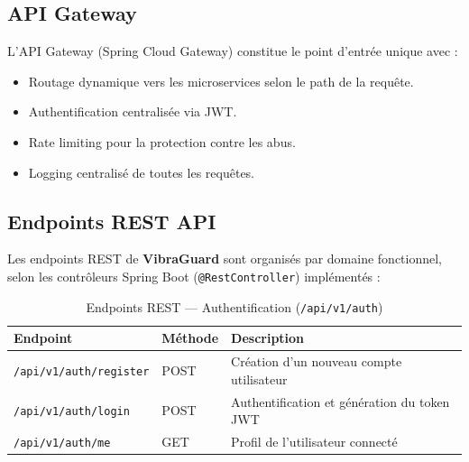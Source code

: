 \documentclass[12pt, a4paper, oneside]{report}
\newcommand{\projectname}{\textbf{VibraGuard}}
\begin{document}
\subsection{API Gateway}

L'API Gateway (Spring Cloud Gateway) constitue le point d'entrée unique avec :
\begin{itemize}
  \item Routage dynamique vers les microservices selon le path de la requête.
  \item Authentification centralisée via JWT.
  \item Rate limiting pour la protection contre les abus.
  \item Logging centralisé de toutes les requêtes.
\end{itemize}

\subsection{Endpoints REST API}

Les endpoints REST de \projectname{} sont organisés par domaine fonctionnel, selon les
contrôleurs Spring Boot (\texttt{@RestController}) implémentés :

\begin{table}[H]
  \centering
  \scriptsize
  \begin{tabularx}{\textwidth}{L{5.5cm} C{1.8cm} L{5cm}}
    \toprule
    \textbf{Endpoint} & \textbf{Méthode} & \textbf{Description} \\
    \midrule
           \texttt{/api/v1/auth/register} & POST & Création d'un nouveau compte utilisateur \\
    \texttt{/api/v1/auth/login}    & POST & Authentification et génération du token JWT \\
           \texttt{/api/v1/auth/me}       & GET  & Profil de l'utilisateur connecté \\
    \bottomrule
  \end{tabularx}
  \caption{Endpoints REST --- Authentification (\texttt{/api/v1/auth})}
\end{table}
\end{document}
